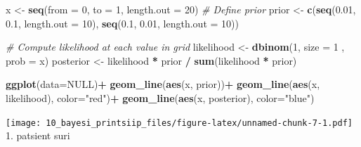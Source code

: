 \documentclass[]{book}
\newenvironment{Shaded}{\begin{snugshade}}{\end{snugshade}}
\newcommand{\CommentTok}[1]{\textcolor[rgb]{0.56,0.35,0.01}{\textit{#1}}}
\newcommand{\DataTypeTok}[1]{\textcolor[rgb]{0.13,0.29,0.53}{#1}}
\newcommand{\DecValTok}[1]{\textcolor[rgb]{0.00,0.00,0.81}{#1}}
\newcommand{\FloatTok}[1]{\textcolor[rgb]{0.00,0.00,0.81}{#1}}
\newcommand{\KeywordTok}[1]{\textcolor[rgb]{0.13,0.29,0.53}{\textbf{#1}}}
\newcommand{\NormalTok}[1]{#1}
\newcommand{\OperatorTok}[1]{\textcolor[rgb]{0.81,0.36,0.00}{\textbf{#1}}}
\newcommand{\OtherTok}[1]{\textcolor[rgb]{0.56,0.35,0.01}{#1}}
\newcommand{\StringTok}[1]{\textcolor[rgb]{0.31,0.60,0.02}{#1}}
\begin{document}
\begin{Shaded}
\begin{Highlighting}[]
\NormalTok{x <-}\StringTok{ }\KeywordTok{seq}\NormalTok{(}\DataTypeTok{from =} \DecValTok{0}\NormalTok{, }\DataTypeTok{to =} \DecValTok{1}\NormalTok{, }\DataTypeTok{length.out =} \DecValTok{20}\NormalTok{)}
\CommentTok{# Define prior}
\NormalTok{prior <-}\StringTok{ }\KeywordTok{c}\NormalTok{(}\KeywordTok{seq}\NormalTok{(}\FloatTok{0.01}\NormalTok{, }\FloatTok{0.1}\NormalTok{, }\DataTypeTok{length.out =} \DecValTok{10}\NormalTok{), }\KeywordTok{seq}\NormalTok{(}\FloatTok{0.1}\NormalTok{, }\FloatTok{0.01}\NormalTok{, }\DataTypeTok{length.out =} \DecValTok{10}\NormalTok{))}

\CommentTok{# Compute likelihood at each value in grid}
\NormalTok{likelihood <-}\StringTok{ }\KeywordTok{dbinom}\NormalTok{(}\DecValTok{1}\NormalTok{, }\DataTypeTok{size =} \DecValTok{1}\NormalTok{ , }\DataTypeTok{prob =}\NormalTok{ x)}
\NormalTok{posterior <-}\StringTok{ }\NormalTok{likelihood }\OperatorTok{*}\StringTok{ }\NormalTok{prior }\OperatorTok{/}\StringTok{ }\KeywordTok{sum}\NormalTok{(likelihood }\OperatorTok{*}\StringTok{ }\NormalTok{prior)}

\KeywordTok{ggplot}\NormalTok{(}\DataTypeTok{data=}\OtherTok{NULL}\NormalTok{)}\OperatorTok{+}
\StringTok{  }\KeywordTok{geom_line}\NormalTok{(}\KeywordTok{aes}\NormalTok{(x, prior))}\OperatorTok{+}
\StringTok{  }\KeywordTok{geom_line}\NormalTok{(}\KeywordTok{aes}\NormalTok{(x, likelihood), }\DataTypeTok{color=}\StringTok{"red"}\NormalTok{)}\OperatorTok{+}
\StringTok{  }\KeywordTok{geom_line}\NormalTok{(}\KeywordTok{aes}\NormalTok{(x, posterior), }\DataTypeTok{color=}\StringTok{"blue"}\NormalTok{)}
\end{Highlighting}
\end{Shaded}

\texttt{[image: 10\_bayesi\_printsiip\_files/figure-latex/unnamed-chunk-7-1.pdf]}
1. patsient suri
\end{document}
